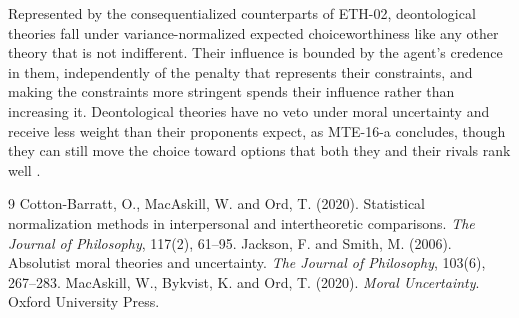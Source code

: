 \documentclass{situationist-preprint}
\begin{document}
Represented by the consequentialized counterparts of ETH-02, deontological theories fall under variance-normalized expected choiceworthiness like any other theory that is not indifferent. Their influence is bounded by the agent's credence in them, independently of the penalty that represents their constraints, and making the constraints more stringent spends their influence rather than increasing it. Deontological theories have no veto under moral uncertainty and receive less weight than their proponents expect, as MTE-16-a concludes, though they can still move the choice toward options that both they and their rivals rank well \citep{MacAskillBykvistOrd2020, CottonBarrattMacAskillOrd2020}.

\begin{thebibliography}{9}\small
{} Cotton-Barratt, O., MacAskill, W. and Ord, T. (2020). Statistical normalization methods in interpersonal and intertheoretic comparisons. \emph{The Journal of Philosophy}, 117(2), 61--95.
 Jackson, F. and Smith, M. (2006). Absolutist moral theories and uncertainty. \emph{The Journal of Philosophy}, 103(6), 267--283.
 MacAskill, W., Bykvist, K. and Ord, T. (2020). \emph{Moral Uncertainty}. Oxford University Press.
\end{thebibliography}
\end{document}
